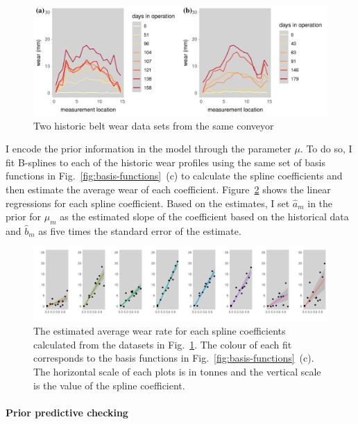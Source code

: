 \begin{figure}
  \centering
  \includegraphics[width=\textwidth]{figures/ch-6/historic_belts.pdf}
  \caption{Two historic belt wear data sets from the same conveyor}
  \label{fig:previouse-belts}
\end{figure}

I encode the prior information in the model through the parameter $\mu$. To do so, I fit B-splines to each of the historic wear profiles using the same set of basis functions in Fig.~\ref{fig:basis-functions}~(c) to calculate the spline coefficients and then estimate the average wear of each coefficient. Figure~\ref{fig:inf-prior-mu} shows the linear regressions for each spline coefficient. Based on the estimates, I set $\hat{a}_m$ in the prior for $\mu_m$ as the estimated slope of the coefficient based on the historical data and $\hat{b}_m$ as five times the standard error of the estimate.

\begin{figure}
  \centering
  \includegraphics[width=\textwidth]{figures/ch-6/informative-prior-mu.pdf}
  \caption{The estimated average wear rate for each spline coefficients calculated from the datasets in Fig.~\ref{fig:previouse-belts}. The colour of each fit corresponds to the basis functions in Fig.~\ref{fig:basis-functions}~(c). The horizontal scale of each plots is in tonnes and the vertical scale is the value of the spline coefficient.}
  \label{fig:inf-prior-mu}
\end{figure}

\paragraph*{Prior predictive checking}


